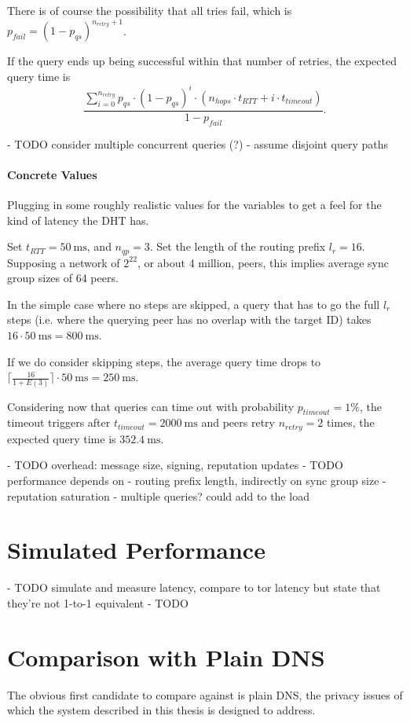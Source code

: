There is of course the possibility that all tries fail, which is $p_{fail} = (1
- p_{qs})^{n_{retry} + 1}$.

If the query ends up being successful within that number of retries,
the expected query time is
\[\frac{\sum_{i = 0}^{n_{retry}}p_{qs} \cdot (1 - p_{qs})^i \cdot (n_{hops}
\cdot t_{RTT} + i \cdot t_{timeout})}{1 - p_{fail}}.\]

- TODO consider multiple concurrent queries (?)
    - assume disjoint query paths

\paragraph{Concrete Values}
Plugging in some roughly realistic values for the variables to get a feel for
the kind of latency the \ac{DHT} has.

Set $t_{RTT} = \SI{50}{\milli\second}$, and $n_{qp} = 3$. Set the length of the
routing prefix $l_r = 16$. Supposing a network of $2^{22}$, or about 4 million,
peers, this implies average sync group sizes of 64 peers.

In the simple case where no steps are skipped, a query that has to go the full
$l_r$ steps (i.e. where the querying peer has no overlap with the target ID)
takes $16 \cdot \SI{50}{\milli\second} = \SI{800}{\milli\second}$.

If we do consider skipping steps, the average query time drops to
$\lceil\frac{16}{1 + E(3)}\rceil \cdot \SI{50}{\milli\second} =
\SI{250}{\milli\second}$.

Considering now that queries can time out with probability $p_{timeout} = 1\%$,
the timeout triggers after $t_{timeout} = \SI{2000}{\milli\second}$ and peers
retry $n_{retry} = 2$ times, the expected query time is
$\SI{352.4}{\milli\second}$.

- TODO overhead: message size, signing, reputation updates
- TODO performance depends on
    - routing prefix length, indirectly on sync group size
    - reputation saturation
    - multiple queries? could add to the load

\section{Simulated Performance}
- TODO simulate and measure latency, compare to tor latency but state that
  they're not 1-to-1 equivalent
- TODO

\section{Comparison with Plain DNS}
The obvious first candidate to compare against is plain DNS, the privacy issues
of which the system described in this thesis is designed to address.

